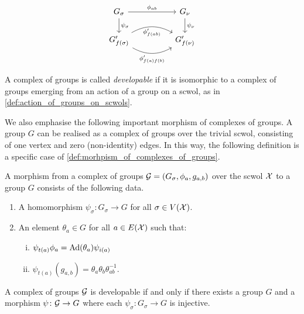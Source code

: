 \begin{equation*}
	\begin{tikzcd}
		G_\sigma \ar[d, "\psi_\sigma"] \ar[rr, "\phi_{ab}"] & &  G_\nu \ar[d, "\psi_\nu"]\\
		G^\prime_{f(\sigma)} \ar[rr, bend right, "\phi^\prime_{f(a)f(b)}"'] \ar[rr, bend left, "\phi^\prime_{f(ab)}"'] & & G^\prime_{f(\nu)}
	\end{tikzcd}
\end{equation*}

\begin{definition}
	A complex of groups is called \emph{developable} if it is isomorphic to a complex of groups emerging from an action of a group on a scwol, as in \cref{def:action_of_groups_on_scwols}.
\end{definition}

We also emphasise the following important morphism of complexes of groups.
A group $G$ can be realised as a complex of groups over the trivial scwol, consisting of one vertex and zero (non-identity) edges.
In this way, the following definition is a specific case of \cref{def:morhpism_of_complexes_of_groups}.

\begin{definition}
	A morphism from a complex of groups $\mathcal{G} = (G_\sigma, \phi_a, g_{a,b})$ over the scwol $\mathcal{X}$ to a group $G$ consists of the following data.
	\begin{enumerate}
		\item A homomorphism $\psi_\sigma \colon G_\sigma \to G$ for all $\sigma \in V(\mathcal{X})$.
		\item An element $\theta_a \in G$ for all $a \in E(\mathcal{X})$ such that:
		      \begin{enumerate}[(i)]
			      \item $\psi_{t(a)}\phi_a = \operatorname{Ad}(\theta_a)\psi_{i(a)}$
			      \item $\psi_{t(a)}(g_{a,b}) = \theta_a\theta_b\theta_{ab}^{-1}$.
		      \end{enumerate}
	\end{enumerate}
\end{definition}

\begin{theorem}
	A complex of groups $\mathcal{G}$ is developable if and only if there exists a group $G$ and a morphism $\psi \colon \mathcal{G} \to G$ where each $\psi_\sigma \colon G_\sigma \to G$ is injective.
\end{theorem}

